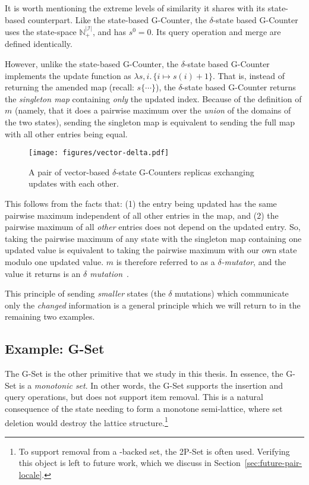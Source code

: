 It is worth mentioning the extreme levels of similarity it shares with its
state-based counterpart. Like the state-based G-Counter, the $\delta$-state based
G-Counter uses the state-space $\mathbb{N}^{|\mathcal{I}|}_+$, and has $s^0 = 0$.
Its query operation and merge are defined identically.

However, unlike the state-based G-Counter, the $\delta$-state based G-Counter
implements the update function as $\lambda s,i.\, \{ i \mapsto s(i) + 1\}$. That
is, instead of returning the amended map (recall: $s\{ \cdots \}$), the
$\delta$-state based G-Counter returns the \emph{singleton map} containing
\emph{only} the updated index. Because of the definition of $m$ (namely, that it
does a pairwise maximum over the \emph{union} of the domains of the two states),
sending the singleton map is equivalent to sending the full map with all other
entries being equal.

\begin{figure}[H]
  \centering
  \texttt{[image: figures/vector-delta.pdf]}
  \caption{A pair of vector-based $\delta$-state G-Counters replicas exchanging
    updates with each other.}
\end{figure}

This follows from the facts that: (1) the entry being updated has the same
pairwise maximum independent of all other entries in the map, and (2) the
pairwise maximum of all \emph{other} entries does not depend on the updated
entry. So, taking the pairwise maximum of any state with the singleton map
containing one updated value is equivalent to taking the pairwise maximum with
our own state modulo one updated value. $m$ is therefore referred to as a
\emph{$\delta$-mutator}, and the value it returns is an \emph{$\delta$
mutation}~\citep{almedia18}.

This principle of sending \emph{smaller} states (the $\delta$ mutations) which
communicate only the \emph{changed} information is a general principle which
we will return to in the remaining two examples.

\subsection{Example: G-Set}
\label{sec:example-gset}

The G-Set is the other primitive \CRDT that we study in this thesis. In essence,
the G-Set is a \emph{monotonic set}. In other words, the G-Set supports the
insertion and query operations, but does not support item removal. This
is a natural consequence of the state needing to form a monotone semi-lattice,
where set deletion would destroy the lattice structure.\footnote{To support
removal from a \CRDT-backed set, the 2P-Set is often used. Verifying this object
is left to future work, which we discuss in
Section~\ref{sec:future-pair-locale}.}

